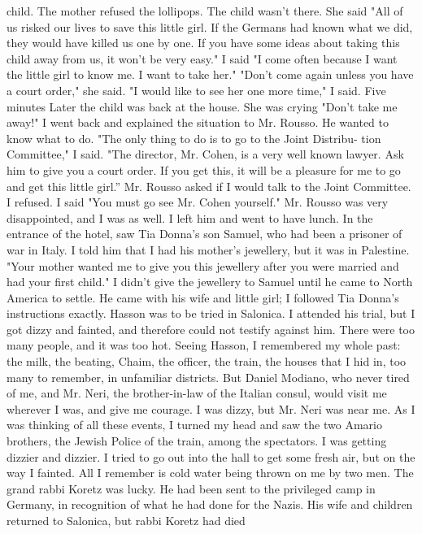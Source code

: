 child.
The mother refused the lollipops.
The child wasn't there.
She 
said "All of us risked our lives to save this little girl.
If the Germans had known what we did, they would have killed us one by one.
If you 
have some ideas about taking this child away from us, it won't be very 
easy."
I said "I come often because I want the little girl to know me.
I 
want to take her."
"Don't come again unless you have a court order," she said.
"I would like to see her one more time," I said.
Five minutes Later 
the child was back at the house.
She was crying "Don't take me away!"
I went back and explained the situation to Mr.
Rousso.
He wanted to 
know what to do.
"The only thing to do is to go to the Joint Distribu-
tion Committee," I said.
"The director, Mr.
Cohen, is a very well known 
lawyer.
Ask him to give you a court order.
If you get this, it will be 
a pleasure for me to go and get this little girl.” Mr.
Rousso asked
if I would talk to the Joint Committee.
I refused.
I said "You must 
go see Mr.
Cohen yourself."
Mr.
Rousso was very disappointed, and I was 
as well.
I left him and went to have lunch.
In the entrance of the hotel, 
saw Tia Donna's son Samuel, who had been a prisoner of war in Italy.
I 
told him that I had his mother's jewellery, but it was in Palestine.
"Your mother wanted me to give you this jewellery after you were married 
and had your first child."
I didn't give the jewellery to Samuel until 
he came to North America to settle.
He came with his wife and little 
girl; I followed Tia Donna's instructions exactly.
Hasson was to be tried in Salonica.
I attended his trial, but I 
got dizzy and fainted, and therefore could not testify against him.
There 
were too many people, and it was too hot.
Seeing Hasson, I remembered my 
whole past: the milk, the beating, Chaim, the officer, the train, the 
houses that I hid in, too many to remember, in unfamiliar districts.
But 
Daniel Modiano, who never tired of me, and Mr.
Neri, the brother-in-law 
of the Italian consul, would visit me wherever I was, and give me courage.
I was dizzy, but Mr.
Neri was near me.
As I was thinking of all these events, I turned my head and saw the 
two Amario brothers, the Jewish Police of the train, among the spectators.
I was getting dizzier and dizzier.
I tried to go out into the 
hall to get some fresh air, but on the way I fainted.
All I remember 
is cold water being thrown on me by two men.
The grand rabbi Koretz was lucky.
He had been sent to the privileged camp in Germany, in recognition of what he had done for the Nazis.
His wife and children returned to Salonica, but rabbi Koretz had died 
